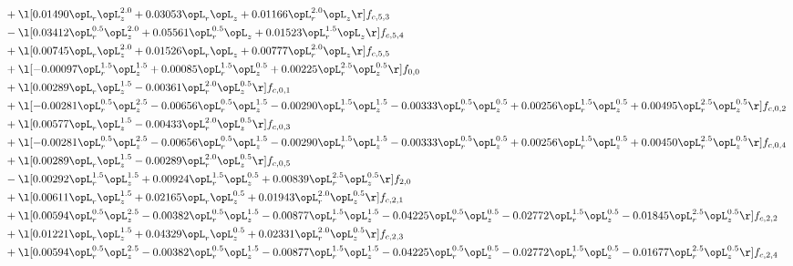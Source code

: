 \begin{alignat}{2}
& + \l[  0.01490 \opL_r \opL_z^{2.0} +  0.03053 \opL_r \opL_z +  0.01166 \opL_r^{2.0} \opL_z  \r] f_{c,5,3} \nonumber \\ 
& - \l[  0.03412 \opL_r^{0.5} \opL_z^{2.0} +  0.05561 \opL_r^{0.5} \opL_z +  0.01523 \opL_r^{1.5} \opL_z  \r] f_{c,5,4} \nonumber \\ 
& + \l[  0.00745 \opL_r \opL_z^{2.0} +  0.01526 \opL_r \opL_z +  0.00777 \opL_r^{2.0} \opL_z  \r] f_{c,5,5} \nonumber \\ 
& + \l[  -0.00097 \opL_r^{1.5} \opL_z^{1.5} +  0.00085 \opL_r^{1.5} \opL_z^{0.5} +  0.00225 \opL_r^{2.5} \opL_z^{0.5}  \r] f_{0,0} \nonumber \\ 
& + \l[  0.00289 \opL_r \opL_z^{1.5}   -0.00361 \opL_r^{2.0} \opL_z^{0.5}  \r] f_{c,0,1} \nonumber \\ 
& + \l[  -0.00281 \opL_r^{0.5} \opL_z^{2.5}   -0.00656 \opL_r^{0.5} \opL_z^{1.5}   -0.00290 \opL_r^{1.5} \opL_z^{1.5}   -0.00333 \opL_r^{0.5} \opL_z^{0.5} +  0.00256 \opL_r^{1.5} \opL_z^{0.5} +  0.00495 \opL_r^{2.5} \opL_z^{0.5}  \r] f_{c,0,2} \nonumber \\ 
& + \l[  0.00577 \opL_r \opL_z^{1.5}   -0.00433 \opL_r^{2.0} \opL_z^{0.5}  \r] f_{c,0,3} \nonumber \\ 
& + \l[  -0.00281 \opL_r^{0.5} \opL_z^{2.5}   -0.00656 \opL_r^{0.5} \opL_z^{1.5}   -0.00290 \opL_r^{1.5} \opL_z^{1.5}   -0.00333 \opL_r^{0.5} \opL_z^{0.5} +  0.00256 \opL_r^{1.5} \opL_z^{0.5} +  0.00450 \opL_r^{2.5} \opL_z^{0.5}  \r] f_{c,0,4} \nonumber \\ 
& + \l[  0.00289 \opL_r \opL_z^{1.5}   -0.00289 \opL_r^{2.0} \opL_z^{0.5}  \r] f_{c,0,5} \nonumber \\ 
& - \l[  0.00292 \opL_r^{1.5} \opL_z^{1.5} +  0.00924 \opL_r^{1.5} \opL_z^{0.5} +  0.00839 \opL_r^{2.5} \opL_z^{0.5}  \r] f_{2,0} \nonumber \\ 
& + \l[  0.00611 \opL_r \opL_z^{1.5} +  0.02165 \opL_r \opL_z^{0.5} +  0.01943 \opL_r^{2.0} \opL_z^{0.5}  \r] f_{c,2,1} \nonumber \\ 
& + \l[  0.00594 \opL_r^{0.5} \opL_z^{2.5}   -0.00382 \opL_r^{0.5} \opL_z^{1.5}   -0.00877 \opL_r^{1.5} \opL_z^{1.5}   -0.04225 \opL_r^{0.5} \opL_z^{0.5}   -0.02772 \opL_r^{1.5} \opL_z^{0.5}   -0.01845 \opL_r^{2.5} \opL_z^{0.5}  \r] f_{c,2,2} \nonumber \\ 
& + \l[  0.01221 \opL_r \opL_z^{1.5} +  0.04329 \opL_r \opL_z^{0.5} +  0.02331 \opL_r^{2.0} \opL_z^{0.5}  \r] f_{c,2,3} \nonumber \\ 
& + \l[  0.00594 \opL_r^{0.5} \opL_z^{2.5}   -0.00382 \opL_r^{0.5} \opL_z^{1.5}   -0.00877 \opL_r^{1.5} \opL_z^{1.5}   -0.04225 \opL_r^{0.5} \opL_z^{0.5}   -0.02772 \opL_r^{1.5} \opL_z^{0.5}   -0.01677 \opL_r^{2.5} \opL_z^{0.5}  \r] f_{c,2,4} \nonumber \\ 

\end{alignat}
